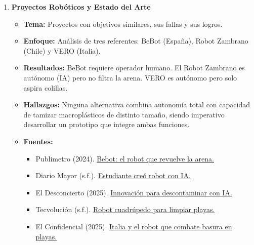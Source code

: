 \documentclass[12pt,a4paper]{article}
\begin{document}
\begin{enumerate}[label=\textbf{\Large\arabic*.}, leftmargin=0pt, labelsep=10pt]
	\item \textbf{Proyectos Robóticos y Estado del Arte}
	      \begin{itemize}[label=\textbullet]
		      \item \textbf{Tema:} Proyectos con objetivos similares, sus fallas y sus logros.
		      \item \textbf{Enfoque:} Análisis de tres referentes: BeBot (España), Robot Zambrano (Chile) y VERO (Italia).
		      \item \textbf{Resultados:} BeBot requiere operador humano. El Robot Zambrano es autónomo (IA) pero no filtra la arena. VERO es autónomo pero solo aspira colillas.
		      \item \textbf{Hallazgos:} Ninguna alternativa combina autonomía total con capacidad de tamizar macroplásticos de distinto tamaño, siendo imperativo desarrollar un prototipo que integre ambas funciones.
		      \item \textbf{Fuentes:}
		            \begin{small}
			            \begin{itemize}[label=-]
				            \item Publimetro (2024). \href{https://www.publimetro.cl/tecnologia/2024/04/18/bebot-este-robot-revuelve-la-arena-de-las-playas-en-busca-de-basura-y-separarla}{Bebot: el robot que revuelve la arena.}
				            \item Diario Mayor (s.f.). \href{https://www.diariomayor.cl/creando-universidad/estudiantes/estudiante-creo-robot-que-recoge-basura-de-las-playas-usando-inteligencia-artificial}{Estudiante creó robot con IA.}
				            \item El Desconcierto (2025). \href{https://eldesconcierto.cl/2025/09/12/innovacion-para-descontaminar-el-medio-ambiente-robot-con-ia-integrada-busca-combatir-la-basura-presente-en-las-playas}{Innovación para descontaminar con IA.}
				            \item Tecvolución (s.f.). \href{https://tecvolucion.com/robot-cuadrupedo-limpiar-playas}{Robot cuadrúpedo para limpiar playas.}
				            \item El Confidencial (2025). \href{https://www.elconfidencial.com/tecnologia/2025-06-09/italia-robot-problema-playas-1qrt_4147283}{Italia y el robot que combate basura en playas.}
			            \end{itemize}
		            \end{small}
	      \end{itemize}


\end{enumerate}
\end{document}
